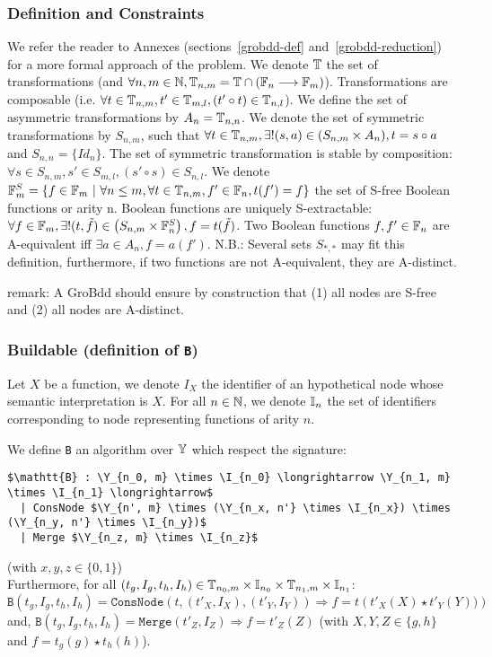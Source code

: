 \documentclass[a4paper,10pt]{article}
\begin{document}
\subsubsection{Definition and Constraints}

We refer the reader to Annexes (sections~\ref{grobdd-def} and~\ref{grobdd-reduction}) for a more formal approach of the problem.
We denote $\mathbb{T}$ the set of transformations (and $\forall n, m\in\mathbb{N}, \mathbb{T}_{n, m} = \mathbb{T} \cap (\mathbb{F}_n \longrightarrow \mathbb{F}_m)$).
Transformations are composable (i.e. $\forall t\in\mathbb{T}_{n, m}, t'\in\mathbb{T}_{m ,l}, (t' \circ t) \in \mathbb{T}_{n, l}$).
We define the set of asymmetric transformations by $A_n = \mathbb{T}_{n, n}$.
We denote the set of symmetric transformations by $S_{n, m}$, such that $\forall t\in\mathbb{T}_{n, m}, \exists!(s, a)\in(S_{n, m}\times A_n), t = s \circ a$ and $S_{n, n} = \{Id_n\}$.
The set of symmetric transformation is stable by composition: $\forall s\in S_{n, m}, s'\in S_{m ,l}, (s' \circ s) \in S_{n, l}$.
We denote $\mathbb{F}^S_m = \{f\in\mathbb{F}_m~|~\forall n \leq m, \forall t\in\mathbb{T}_{n, m}, f'\in\mathbb{F}_n, t(f') = f\}$ the set of S-free Boolean functions or arity n.
Boolean functions are uniquely S-extractable: $\forall f\in\mathbb{F}_m, \exists! (t, \tilde{f})\in \left( S_{n, m} \times \mathbb{F}^S_n \right), f = t(\tilde{f})$.
Two Boolean functions $f, f'\in\mathbb{F}_n$ are A-equivalent iff $\exists a\in A_n, f=a(f')$.
N.B.: Several sets $S_{*, *}$ may fit this definition, furthermore, if two functions are not A-equivalent, they are A-distinct.

remark: A GroBdd should ensure by construction that (1) all nodes are S-free and (2) all nodes are A-distinct.

\subsubsection{Buildable (definition of \texttt{B})}

Let $X$ be a function, we denote $I_X$ the identifier of an hypothetical node whose semantic interpretation is $X$.
For all $n\in\mathbb{N}$, we denote $\mathbb{I}_n$ the set of identifiers corresponding to node representing functions of arity $n$.

We define \texttt{B} an algorithm over $\mathbb{Y}$ which respect the signature:
\begin{lstlisting}
$\mathtt{B} : \Y_{n_0, m} \times \I_{n_0} \longrightarrow \Y_{n_1, m} \times \I_{n_1} \longrightarrow$
  | ConsNode $\Y_{n', m} \times (\Y_{n_x, n'} \times \I_{n_x}) \times (\Y_{n_y, n'} \times \I_{n_y})$
  | Merge $\Y_{n_z, m} \times \I_{n_z}$
\end{lstlisting}
(with $x, y, z \in \{0, 1\}$) \\
Furthermore, for all $(t_g, I_g, t_h, I_h) \in \mathbb{T}_{n_0, m} \times \mathbb{I}_{n_0} \times \mathbb{T}_{n_1, m} \times \mathbb{I}_{n_1}$:
$\texttt{B}(t_g, I_g, t_h, I_h) = \texttt{ConsNode} (t, (t'_X, I_X), (t'_Y, I_Y)) \Rightarrow f = t\left(t'_X(X) \star t'_Y(Y))\right)$
and, $\texttt{B}(t_g, I_g, t_h, I_h) = \texttt{Merge} (t'_Z, I_Z) \Rightarrow f = t'_Z(Z)$ (with $X, Y, Z \in\{g, h\}$ and $f = t_g(g) \star t_h(h)$).
\end{document}
